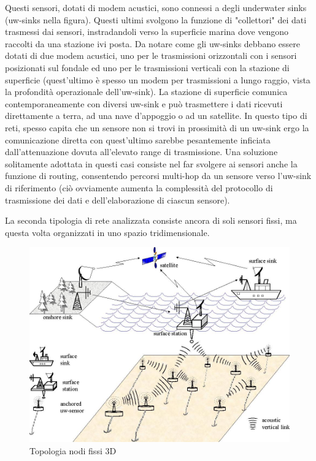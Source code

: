 \documentclass[Lau,binding=0.6cm]{sapthesis}
\begin{document}
Questi sensori, dotati di modem acustici, sono connessi a degli underwater sinks (uw-sinks nella figura). Questi ultimi svolgono la funzione di "collettori" dei dati trasmessi dai sensori, instradandoli verso la superficie marina dove vengono raccolti da una stazione ivi posta. Da notare come gli uw-sinks debbano essere dotati di due modem acustici, uno per le trasmissioni orizzontali con i sensori posizionati sul fondale ed uno per le trasmissioni verticali con la stazione di superficie (quest'ultimo è spesso un modem per trasmissioni a lungo raggio, vista la profondità operazionale dell'uw-sink). La stazione di superficie comunica contemporaneamente con diversi uw-sink e può trasmettere i dati ricevuti direttamente a terra, ad una nave d'appoggio o ad un satellite.
In questo tipo di reti, spesso capita che un sensore non si trovi in prossimità di un uw-sink ergo la comunicazione diretta con quest'ultimo sarebbe pesantemente inficiata dall'attenuazione dovuta all'elevato range di trasmissione. Una soluzione solitamente adottata in questi casi consiste nel far svolgere ai sensori anche la funzione di routing, consentendo percorsi multi-hop da un sensore verso l'uw-sink di riferimento (ciò ovviamente aumenta la complessità del protocollo di trasmissione dei dati e dell'elaborazione di ciascun sensore).

La seconda tipologia di rete analizzata consiste ancora di soli sensori fissi, ma questa volta organizzati in uno spazio tridimensionale.

\begin{figure}[H]
    \centering
	\includegraphics[scale=0.3]{3D_arch.jpg}
	\caption{ Topologia nodi fissi 3D}
	\label{fig:}
\end{figure}
\end{document}
